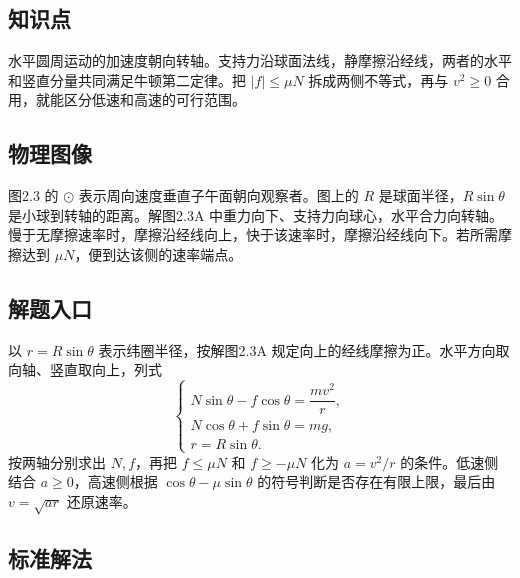 \documentclass[UTF8,fontset=fandol,a4paper,11pt]{ctexart}
\begin{document}
\subsection*{知识点}

水平圆周运动的加速度朝向转轴。支持力沿球面法线，静摩擦沿经线，两者的水平和竖直分量共同满足牛顿第二定律。把 $|f|\leq\mu N$ 拆成两侧不等式，再与 $v^2\geq0$ 合用，就能区分低速和高速的可行范围。




\subsection*{物理图像}

图2.3 的 $\odot$ 表示周向速度垂直子午面朝向观察者。图上的 $R$ 是球面半径，$R\sin\theta$ 是小球到转轴的距离。解图2.3A 中重力向下、支持力向球心，水平合力向转轴。慢于无摩擦速率时，摩擦沿经线向上，快于该速率时，摩擦沿经线向下。若所需摩擦达到 $\mu N$，便到达该侧的速率端点。



\subsection*{解题入口}

以 $r=R\sin\theta$ 表示纬圈半径，按解图2.3A 规定向上的经线摩擦为正。水平方向取向轴、竖直取向上，列式
\[
\begin{cases}
N\sin\theta-f\cos\theta=\dfrac{mv^2}{r},\\
N\cos\theta+f\sin\theta=mg,\\
r=R\sin\theta.
\end{cases}
\]
按两轴分别求出 $N,f$，再把 $f\leq\mu N$ 和 $f\geq-\mu N$ 化为 $a=v^2/r$ 的条件。低速侧结合 $a\geq0$，高速侧根据 $\cos\theta-\mu\sin\theta$ 的符号判断是否存在有限上限，最后由 $v=\sqrt{ar}$ 还原速率。



\subsection*{标准解法}
\end{document}
